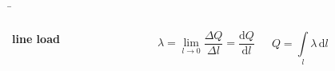 \begin{frame}
{	
	}

	\b{
	\begin{columns}
		
				\textbf{line load}
				\vspace{20pt}
				\begin{figure}[h!]
					\centering
				
				{}
					
				\end{figure}	
			
			\vspace{10pt}
				 
				\begin{equation*}
				\lambda = \lim \limits_{l \to 0} \frac{\Delta Q}{\Delta l} = \frac{\mathrm{d}Q}{\mathrm{d}l}
			\end{equation*}
			
			\begin{equation*}
				Q = \int\limits_l \lambda \, \mathrm{d}l
			\end{equation*}
			

			\rule{.1mm}{0.7\textheight}


		\vspace{2pt}
	
				
		\rule{.1mm}{0.7\textheight}


\end{columns}}
\end{frame}
